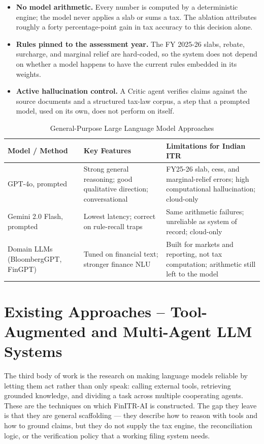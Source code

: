 \documentclass[12pt, a4paper, oneside]{report}
\begin{document}
\begin{itemize}
    \item \textbf{No model arithmetic.} Every number is computed by a
          deterministic engine; the model never applies a slab or sums a tax.
          The ablation attributes roughly a forty percentage-point gain in tax
          accuracy to this decision alone.
    \item \textbf{Rules pinned to the assessment year.} The FY 2025-26 slabs,
          rebate, surcharge, and marginal relief are hard-coded, so the system
          does not depend on whether a model happens to have the current rules
          embedded in its weights.
    \item \textbf{Active hallucination control.} A Critic agent verifies claims
          against the source documents and a structured tax-law corpus, a step
          that a prompted model, used on its own, does not perform on itself.
\end{itemize}

\begin{table}[H]
\centering
\caption{General-Purpose Large Language Model Approaches}
\label{tab:cat-b-comparison}
\small
\begin{tabularx}{\textwidth}{|l|X|X|}
\hline
\textbf{Model / Method} & \textbf{Key Features} & \textbf{Limitations for Indian ITR} \\
\hline
GPT-4o, prompted \cite{ref4} & Strong general reasoning; good qualitative direction; conversational & FY25-26 slab, cess, and marginal-relief errors; high computational hallucination; cloud-only \\
\hline
Gemini 2.0 Flash, prompted \cite{ref5} & Lowest latency; correct on rule-recall traps & Same arithmetic failures; unreliable as system of record; cloud-only \\
\hline
Domain LLMs (BloombergGPT, FinGPT) \cite{ref6} & Tuned on financial text; stronger finance NLU & Built for markets and reporting, not tax computation; arithmetic still left to the model \\
\hline
\end{tabularx}
\end{table}

\section{Existing Approaches -- Tool-Augmented and Multi-Agent LLM Systems}
\label{sec:category-c}

The third body of work is the research on making language models reliable by
letting them act rather than only speak: calling external tools, retrieving
grounded knowledge, and dividing a task across multiple cooperating agents.
These are the techniques on which FinITR-AI is constructed. The gap they leave
is that they are general scaffolding --- they describe how to reason with tools
and how to ground claims, but they do not supply the tax engine, the
reconciliation logic, or the verification policy that a working filing system
needs.
\end{document}
